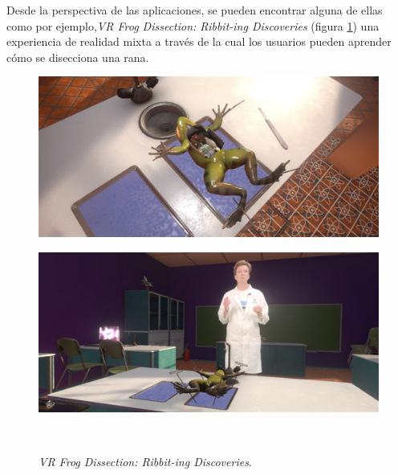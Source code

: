 Desde la perspectiva de las aplicaciones, se pueden encontrar alguna de ellas como por ejemplo,\textit{VR Frog Dissection: Ribbit-ing Discoveries} (figura \ref{fig:vrfrogdissectioncapturas}) una experiencia de realidad mixta a través de la cual los usuarios pueden aprender cómo se disecciona una rana.

\begin{figure}[htbp]
\centering
    \hspace{-4mm}
    \begin{minipage}{0.5\textwidth}
        \centering
        \includegraphics[scale=0.16]{Images/Estado del arte/frogDisection1.jpeg}\\
    \end{minipage}
    \begin{minipage}{0.5\textwidth}
        \centering
        \includegraphics[scale=0.16]{Images/Estado del arte/frogDisection2.jpeg}\\
    \end{minipage}\\
    \caption[VR Frog Dissection: Ribbit-ing Discoveries]{\textit{VR Frog Dissection: Ribbit-ing Discoveries}\footnotemark.}
    \label{fig:vrfrogdissectioncapturas}
\end{figure}


